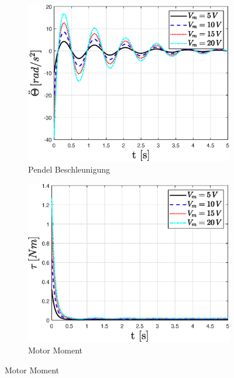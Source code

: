 \begin{figure}
\begin{subfigure}[b]{0.49 \linewidth}
        \label{fig:Vm_sprung_phi_punkt_punkt}
    \end{subfigure}
    \begin{subfigure}[b]{0.49 \linewidth}
        \includegraphics[width=\linewidth]{plot_data/parameter/fig/Vm_sprung/theta_punkt_punkt.eps}
        \caption{Pendel Beschleunigung}
        \label{fig:Vm_sprung_theta_punkt_punkt}
    \end{subfigure}
    \begin{subfigure}[b]{0.49\linewidth}
        \includegraphics[width=\linewidth]{plot_data/parameter/fig/Vm_sprung/tau.eps}
        \caption{Motor Moment}
        \label{fig:Vm_sprung_tau}

\end{subfigure}
\end{figure}
